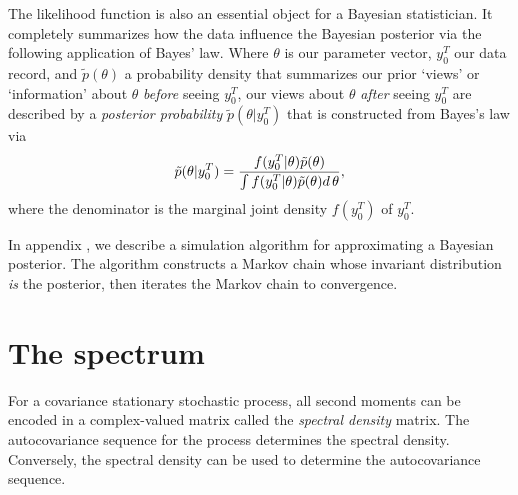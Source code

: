 The likelihood function is also an essential object for a Bayesian statistician.  It completely summarizes how the data influence
the Bayesian posterior via the following application
of Bayes' law.  Where $\theta$ is our parameter vector, $y_0^T$ our data record, and $\tilde p(\theta)$
 a probability density that summarizes our prior `views' or `information' about $\theta$ {\it before\/} seeing  $y_0^T$,
our views about $\theta$ {\it after\/} seeing $y_0^T$ are described by a  {\it posterior probability}  $\tilde p(\theta| y^T_0) $ that is constructed from
Bayes's law via
$$ \tilde p(\theta| y^T_0) =
 {f(y^T_0| \theta ) \tilde p(\theta) \over \int f(y^T_0| \theta )  \tilde p(\theta) d\, \theta} , $$
 where the denominator is the marginal joint density $f(y_0^T)$ of $y_0^T$.



In appendix , we  describe a simulation algorithm for approximating a  Bayesian posterior.  The algorithm constructs a Markov chain
whose invariant distribution {\it is\/} the posterior, then iterates the Markov chain to convergence.
 
%
%
%
%
%


\section{The spectrum}
 For a covariance stationary stochastic process,  all second moments
can be encoded in a complex-valued matrix called the
{\it spectral density} matrix.  The autocovariance sequence for
the process  determines the spectral density. Conversely,
the spectral density can be used to determine the autocovariance sequence.

